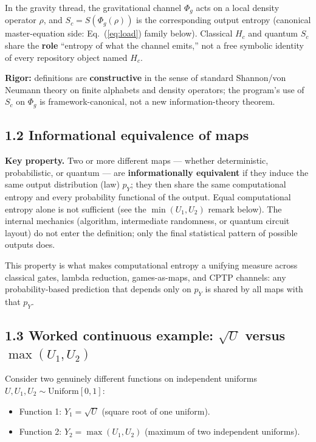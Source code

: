 \documentclass[
  11pt,
]{article}
\providecommand{\tightlist}{%
  \setlength{\itemsep}{0pt}\setlength{\parskip}{0pt}}
\begin{document}
In the gravity thread, the gravitational channel \(\Phi_g\) acts on a
local density operator \(\rho\), and \(S_c = S(\Phi_g(\rho))\) is the
corresponding output entropy (canonical master-equation side:
Eq.~(\ref{eq:load}) family below). Classical \(H_c\) and quantum \(S_c\)
share the \textbf{role} ``entropy of what the channel emits,'' not a
free symbolic identity of every repository object named \(H_c\).

\textbf{Rigor:} definitions are \textbf{constructive} in the sense of
standard Shannon/von Neumann theory on finite alphabets and density
operators; the program's use of \(S_c\) on \(\Phi_g\) is
framework-canonical, not a new information-theory theorem.

\subsection{1.2 Informational equivalence of
maps}\label{informational-equivalence-of-maps}

\textbf{Key property.} Two or more different maps --- whether
deterministic, probabilistic, or quantum --- are \textbf{informationally equivalent} if they induce the same output distribution (law) \(p_Y\); they then share the same computational entropy and every probability functional of the output. Equal computational entropy alone is not sufficient (see the \(\min(U_1,U_2)\) remark below). The internal mechanics (algorithm, intermediate
randomness, or quantum circuit layout) do not enter the definition; only
the final statistical pattern of possible outputs does.

This property is what makes computational entropy a unifying measure
across classical gates, lambda reduction, games-as-maps, and CPTP
channels: any probability-based prediction that depends only on \(p_Y\)
is shared by all maps with that \(p_Y\).

\subsection{\texorpdfstring{1.3 Worked continuous example: \(\sqrt{U}\)
versus
\(\max(U_1,U_2)\)}{1.3 Worked continuous example: \textbackslash sqrt\{U\} versus \textbackslash max(U\_1,U\_2)}}\label{worked-continuous-example-sqrtu-versus-maxu_1u_2}

Consider two genuinely different functions on independent uniforms
\(U,U_1,U_2\sim\mathrm{Uniform}[0,1]\):

\begin{itemize}
\tightlist
\item
  Function 1: \(Y_1=\sqrt{U}\) (square root of one uniform).\\
\item
  Function 2: \(Y_2=\max(U_1,U_2)\) (maximum of two independent
  uniforms).
\end{itemize}
\end{document}
